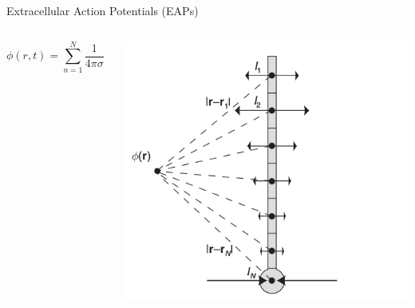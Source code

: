 \documentclass[aspectratio=169]{beamer}
\begin{document}
\begin{frame}{Extracellular Action Potentials (EAPs)}

    \begin{columns}
        \begin{column}{0.48\textwidth}
            $$\phi(r, t) = \sum^N_{n=1} \frac{1}{4\pi\sigma}\frac{I_n(t)}{r_n}$$
        \end{column}
        \begin{column}{0.48\textwidth}
            \begin{center}
                \includegraphics[width=\textwidth]{images/summation.png}
            \end{center}
        \end{column}
    \end{columns}

\end{frame}
\end{document}
